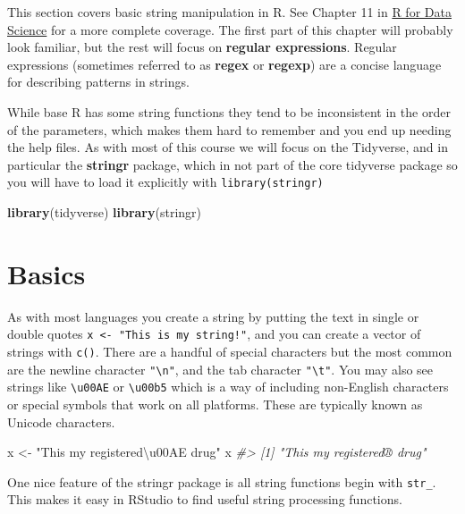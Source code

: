 \documentclass[]{book}
\newenvironment{Shaded}{\begin{snugshade}}{\end{snugshade}}
\newcommand{\KeywordTok}[1]{\textcolor[rgb]{0.13,0.29,0.53}{\textbf{#1}}}
\newcommand{\StringTok}[1]{\textcolor[rgb]{0.31,0.60,0.02}{#1}}
\newcommand{\CommentTok}[1]{\textcolor[rgb]{0.56,0.35,0.01}{\textit{#1}}}
\newcommand{\NormalTok}[1]{#1}
\begin{document}
This section covers basic string manipulation in R. See Chapter 11 in
\href{http://r4ds.had.co.nz/strings.html}{R for Data Science} for a more
complete coverage. The first part of this chapter will probably look
familiar, but the rest will focus on \textbf{regular expressions}.
Regular expressions (sometimes referred to as \textbf{regex} or
\textbf{regexp}) are a concise language for describing patterns in
strings.

While base R has some string functions they tend to be inconsistent in
the order of the parameters, which makes them hard to remember and you
end up needing the help files. As with most of this course we will focus
on the Tidyverse, and in particular the \textbf{stringr} package, which
in not part of the core tidyverse package so you will have to load it
explicitly with \texttt{library(stringr)}

\begin{Shaded}
\begin{Highlighting}[]
\KeywordTok{library}\NormalTok{(tidyverse)}
\KeywordTok{library}\NormalTok{(stringr)}
\end{Highlighting}
\end{Shaded}

\section{Basics}\label{basics}

As with most languages you create a string by putting the text in single
or double quotes \texttt{x\ \textless{}-\ "This\ is\ my\ string!"}, and
you can create a vector of strings with \texttt{c()}. There are a
handful of special characters but the most common are the newline
character \texttt{"\textbackslash{}n"}, and the tab character
\texttt{"\textbackslash{}t"}. You may also see strings like
\texttt{\textbackslash{}u00AE} or \texttt{\textbackslash{}u00b5} which
is a way of including non-English characters or special symbols that
work on all platforms. These are typically known as Unicode characters.

\begin{Shaded}
\begin{Highlighting}[]
\NormalTok{x <-}\StringTok{ "This my registered\textbackslash{}u00AE drug"}
\NormalTok{x}
\CommentTok{#> [1] "This my registered® drug"}
\end{Highlighting}
\end{Shaded}

One nice feature of the stringr package is all string functions begin
with \texttt{str\_}. This makes it easy in RStudio to find useful string
processing functions.
\end{document}
